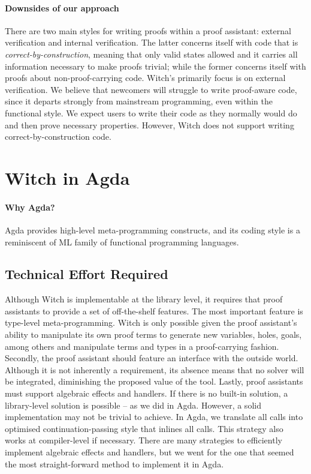 \documentclass[acmsmall]{acmart}
\begin{document}
\paragraph{Downsides of our approach}
There are two main styles for writing proofs within a proof assistant: external
verification and internal verification. The latter concerns itself with code
that is \textit{correct-by-construction}, meaning that only valid states allowed and it
carries all information necessary to make proofs trivial; while the former
concerns itself with proofs about non-proof-carrying code.
Witch's primarily focus is on external verification. We believe that newcomers
will struggle to write proof-aware code, since it departs strongly from
mainstream programming, even within the functional style. We expect users to
write their code as they normally would do and then prove necessary properties.
However, Witch does not support writing correct-by-construction code.

\section{Witch in Agda} \label{witch-agda}





\paragraph{Why Agda?} Agda provides high-level meta-programming constructs, and
its coding style is a reminiscent of ML family of functional programming languages.

\subsection{Technical Effort Required} \label{tech-details}

Although Witch is implementable at the library level, it requires that proof
assistants to provide a set of off-the-shelf features. The most important
feature is type-level meta-programming. Witch is only possible given the proof
assistant's ability to manipulate its own proof terms to generate new variables,
holes, goals, among others and manipulate terms and types in a proof-carrying
fashion. Secondly, the proof assistant should feature an interface with the
outside world. Although it is not inherently a requirement, its absence means
that no solver will be integrated, diminishing the proposed value of the tool.
Lastly, proof assistants must support algebraic effects and handlers. If there
is no built-in solution, a library-level solution is possible -- as we did in
Agda. However, a solid implementation may not be trivial to achieve. In Agda,
we translate all calls into optimised continuation-passing style that inlines
all calls. This strategy also works at compiler-level if necessary. There are
many strategies to efficiently implement algebraic effects and handlers, but we
went for the one that seemed the most straight-forward method to implement it in Agda.
\end{document}
